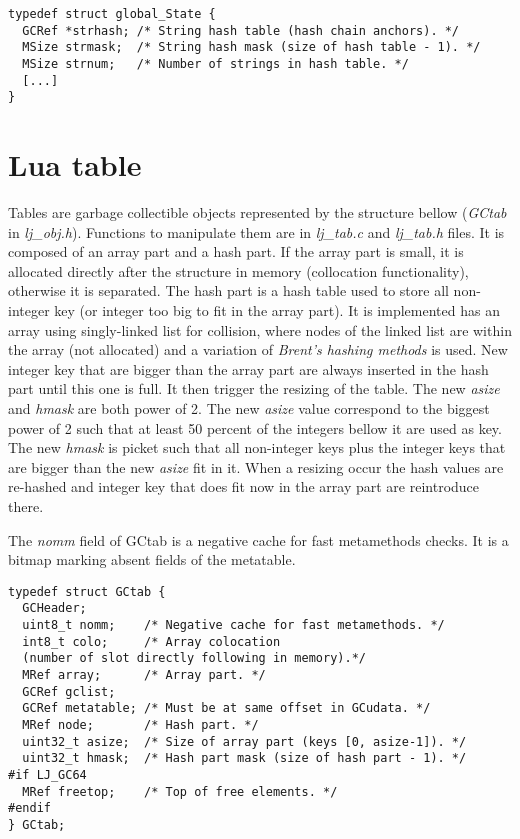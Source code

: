 \begin{lstlisting}[style=CStyle]
typedef struct global_State {
  GCRef *strhash; /* String hash table (hash chain anchors). */
  MSize strmask;  /* String hash mask (size of hash table - 1). */
  MSize strnum;   /* Number of strings in hash table. */
  [...]
}
\end{lstlisting}

\section{Lua table}
\label{Sec:table}

Tables are garbage collectible objects represented by the structure bellow
(\emph{GCtab} in \emph{lj\_obj.h}). Functions to manipulate them are in
\emph{lj\_tab.c} and \emph{lj\_tab.h} files. It is composed of an array part and
a hash part. If the array part is small, it is allocated directly after the
structure in memory (collocation functionality), otherwise it is separated. The
hash part is a hash table used to store all non-integer key (or integer too big
to fit in the array part). It is implemented has an array using singly-linked
list for collision, where nodes of the linked list are within the array (not
allocated) and a variation of \emph{Brent's hashing methods} is used.
New integer key that are bigger than the array part are always inserted
in the hash part until this one is full. It then trigger the resizing of the
table. The new \emph{asize} and \emph{hmask} are both power of 2. The
new \emph{asize} value correspond to the biggest power of 2 such that at least
50 percent of the integers bellow it are used as key. The new \emph{hmask} is
picket such that all non-integer keys plus the integer keys that are bigger than
the new \emph{asize} fit in it. When a resizing occur the hash values are
re-hashed and integer key that does fit now in the array part are reintroduce
there.

The \emph{nomm} field of GCtab is a
negative cache for fast metamethods checks. It is a bitmap marking absent fields
of the metatable.

\begin{lstlisting}[style=CStyle]
typedef struct GCtab {
  GCHeader;
  uint8_t nomm;    /* Negative cache for fast metamethods. */
  int8_t colo;     /* Array colocation
  (number of slot directly following in memory).*/
  MRef array;      /* Array part. */
  GCRef gclist;
  GCRef metatable; /* Must be at same offset in GCudata. */
  MRef node;       /* Hash part. */
  uint32_t asize;  /* Size of array part (keys [0, asize-1]). */
  uint32_t hmask;  /* Hash part mask (size of hash part - 1). */
#if LJ_GC64
  MRef freetop;    /* Top of free elements. */
#endif
} GCtab;
\end{lstlisting}


